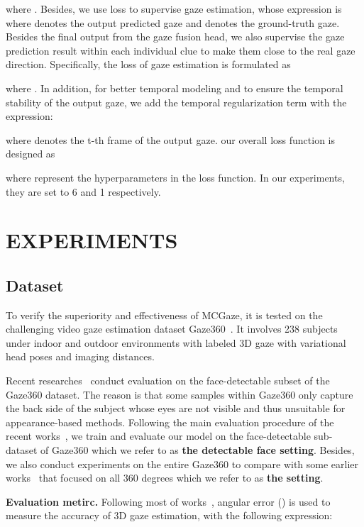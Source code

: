 \documentclass[journal]{IEEEtran}
\begin{document}
where . Besides, we use  loss to supervise gaze estimation, whose expression is
 where  denotes the output predicted gaze and  denotes the ground-truth gaze. Besides the final output  from the gaze fusion head, we also supervise the gaze prediction result within each individual clue to make them close to the real gaze direction.
Specifically, the loss of gaze estimation is formulated as 

where . In addition, for better temporal modeling and to ensure the temporal stability of the output gaze, we add the temporal regularization term  with the expression:

where  denotes the t-th frame of the output gaze. our overall loss function is designed as

where represent the hyperparameters in the loss function. In our experiments, they are set to 6 and 1 respectively.
\section{EXPERIMENTS}
\subsection{Dataset}
To verify the superiority and effectiveness of MCGaze, it is tested on the challenging video gaze estimation dataset Gaze360~\cite{kellnhofer2019gaze360}. It involves 238 subjects under indoor and outdoor environments with labeled 3D gaze with variational head poses and imaging distances.


Recent researches~\cite{cheng2022gaze,abdelrahman2022l2cs,yan2023gaze} conduct evaluation on the face-detectable subset of the Gaze360 dataset. The reason is that some samples within Gaze360 only capture the back side of the subject whose eyes are not visible and thus unsuitable for appearance-based methods. Following the main evaluation procedure of the recent works~\cite{cheng2022gaze,abdelrahman2022l2cs,yan2023gaze}, we train and evaluate our model on the face-detectable sub-dataset of Gaze360 which we refer to as \textbf{the detectable face setting}.
Besides, we also conduct experiments on the entire Gaze360 to compare with some earlier works~\cite{kellnhofer2019gaze360,kothari2021weakly} that focused on all 360 degrees which we refer to as \textbf{the  setting}.


\textbf{Evaluation metirc.} Following most of works~\cite{kellnhofer2019gaze360,cheng2022gaze,abdelrahman2022l2cs,yan2023gaze, 2eye_gaze}, angular error () is used to measure the accuracy of 3D gaze estimation, with the following expression: 
\end{document}
